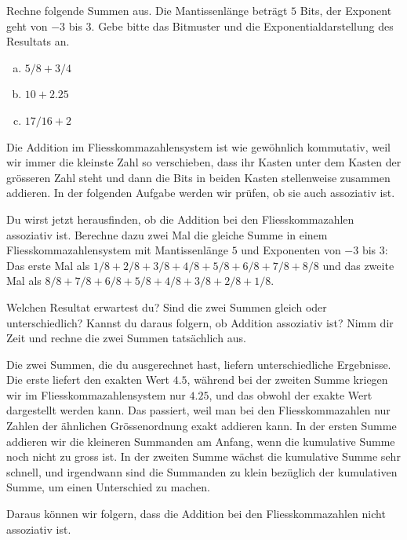 \begin{aufgabe}\label{addition}
Rechne folgende Summen aus. Die Mantissenlänge beträgt \(5\) Bits, der Exponent geht von \(-3\) bis \(3\). Gebe bitte das Bitmuster und die Exponentialdarstellung des Resultats an.
\begin{enumerate}[(a)]
\item \(5/8 + 3/4\)
\item \(10 + 2.25\)
\item \(17/16 + 2\)
\end{enumerate}
\end{aufgabe}

Die Addition im Fliesskommazahlensystem ist wie gewöhnlich kommutativ, weil wir immer die kleinste Zahl so verschieben, dass ihr Kasten unter dem Kasten der grösseren Zahl steht und dann die Bits in beiden Kasten stellenweise zusammen addieren. In der folgenden Aufgabe werden wir prüfen, ob sie auch assoziativ ist.

\begin{lernaufgabe*}\label{lernaufgabe_assoziativ}
Du wirst jetzt herausfinden, ob die Addition bei den Fliesskommazahlen assoziativ ist. Berechne dazu zwei Mal die gleiche Summe in einem Fliesskommazahlensystem mit Mantissenlänge \(5\) und Exponenten von \(-3\) bis \(3\):
Das erste Mal als \(1/8 + 2/8 + 3/8 + 4/8 + 5/8 + 6/8 + 7/8 + 8/8\) und das zweite Mal als \(8/8 + 7/8 + 6/8 + 5/8 + 4/8 + 3/8 + 2/8 + 1/8\).

Welchen Resultat erwartest du? Sind die zwei Summen gleich oder unterschiedlich? Kannst du daraus folgern, ob Addition assoziativ ist?
Nimm dir Zeit und rechne die zwei Summen tatsächlich aus.
\end{lernaufgabe*}

Die zwei Summen, die du ausgerechnet hast, liefern unterschiedliche Ergebnisse. Die erste liefert den exakten Wert \(4.5\), während bei der zweiten Summe kriegen wir im Fliesskommazahlensystem nur \(4.25\), und das obwohl der exakte Wert dargestellt werden kann. Das passiert, weil man bei den Fliesskommazahlen nur Zahlen der ähnlichen Grössenordnung exakt addieren kann. In der ersten Summe addieren wir die kleineren Summanden am Anfang, wenn die kumulative Summe noch nicht zu gross ist. In der zweiten Summe wächst die kumulative Summe sehr schnell, und irgendwann sind die Summanden zu klein bezüglich der kumulativen Summe, um einen Unterschied zu machen.

Daraus können wir folgern, dass die Addition bei den Fliesskommazahlen nicht assoziativ ist.


